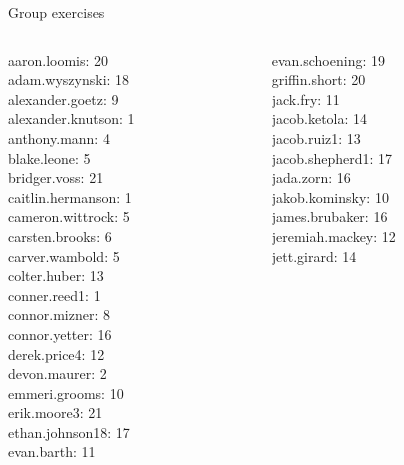 \documentclass[10pt]{beamer}
\begin{document}
\begin{frame}
\begin{minipage}{0.35\textwidth}
\end{minipage}
\end{frame}


\begin{frame}[standout]
Group exercises
\end{frame}

\begin{frame}
\footnotesize 
\vfill 
\begin{columns}
\begin{column}{0.33\textwidth}
aaron.loomis: 20 \\ 
adam.wyszynski: 18 \\ 
alexander.goetz: 9 \\ 
alexander.knutson: 1 \\ 
anthony.mann: 4 \\ 
blake.leone: 5 \\ 
bridger.voss: 21 \\ 
caitlin.hermanson: 1 \\ 
cameron.wittrock: 5 \\ 
carsten.brooks: 6 \\ 
carver.wambold: 5 \\ 
colter.huber: 13 \\ 
conner.reed1: 1 \\ 
connor.mizner: 8 \\ 
connor.yetter: 16 \\ 
derek.price4: 12 \\ 
devon.maurer: 2 \\ 
emmeri.grooms: 10 \\ 
erik.moore3: 21 \\ 
ethan.johnson18: 17 \\ 
evan.barth: 11 \\\end{column}
\begin{column}{0.33\textwidth}
evan.schoening: 19 \\ 
griffin.short: 20 \\ 
jack.fry: 11 \\ 
jacob.ketola: 14 \\ 
jacob.ruiz1: 13 \\ 
jacob.shepherd1: 17 \\ 
jada.zorn: 16 \\ 
jakob.kominsky: 10 \\ 
james.brubaker: 16 \\ 
jeremiah.mackey: 12 \\ 
jett.girard: 14 \\ 

\end{column}
\end{columns}
\end{frame}
\end{document}

